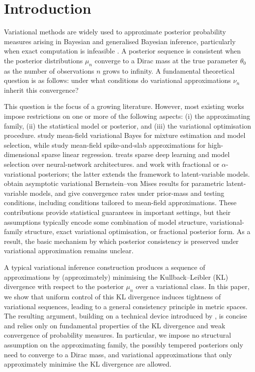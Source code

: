 \documentclass[11pt]{article}
\theoremstyle{plain}
\theoremstyle{definition}
\theoremstyle{remark}
\begin{document}
\section{Introduction}

Variational methods are widely used to approximate posterior probability measures arising in Bayesian and generalised Bayesian inference, particularly when exact computation is infeasible \citep{blei2017variational, zhang2019}.
A posterior sequence is consistent when the posterior distributions $\mu_n$ converge to a Dirac mass at the true parameter $\theta_0$ as the number of observations $n$ grows to infinity.
A fundamental theoretical question is as follows: under what conditions do variational approximations $\nu_n$ inherit this convergence?

This question is the focus of a growing literature. However, most existing works impose restrictions on one or more of the following aspects: (i) the approximating family, (ii) the statistical model or posterior, and (iii) the variational optimisation procedure. \citet{cherief2018consistency-mixtures} study mean-field variational Bayes for mixture estimation and model selection, while \citet{RaySzabo2022VBHDLR} study mean-field spike-and-slab approximations for high-dimensional sparse linear regression. \citet{cherief-abdellatif2020convergence} treats sparse deep learning and model selection over neural-network architectures. \citet{alquier2020concentration} and \citet{yang2020alpha} work with fractional or $\alpha$-variational posteriors; the latter extends the framework to latent-variable models. \citet{whang2019} obtain asymptotic variational Bernstein--von Mises results for parametric latent-variable models, and \citet{zhang2020convergence} give convergence rates under prior-mass and testing conditions, including conditions tailored to mean-field approximations. These contributions provide statistical guarantees in important settings, but their assumptions typically encode some combination of model structure, variational-family structure, exact variational optimisation, or fractional posterior form. As a result, the basic mechanism by which posterior consistency is preserved under variational approximation remains unclear.


A typical variational inference construction produces a sequence of approximations by (approximately) minimising the Kullback--Leibler (KL) divergence with respect to the posterior $\mu_n$ over a variational class. In this paper, we show that uniform control of this KL divergence induces tightness of variational sequences, leading to a general consistency principle in metric spaces. The resulting argument, building on a technical device introduced by \citet{RaySzabo2022VBHDLR}, is concise and relies only on fundamental properties of the KL divergence and weak convergence of probability measures. In particular, we impose no structural assumption on the approximating family, the possibly tempered posteriors only need to converge to a Dirac mass, and variational approximations that only approximately minimise the KL divergence are allowed.
\end{document}
